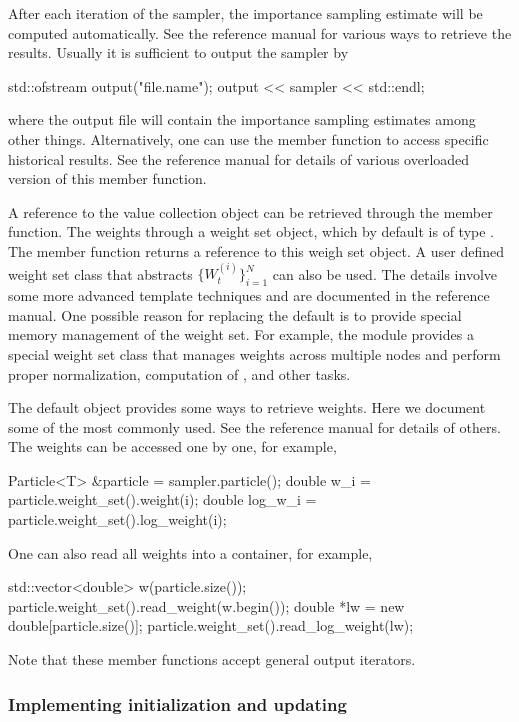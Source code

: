 After each iteration of the sampler, the importance sampling estimate will be
computed automatically. See the reference manual for various ways to retrieve
the results. Usually it is sufficient to output the sampler by
\begin{cppcode}
std::ofstream output("file.name");
output << sampler << std::endl;
\end{cppcode}
where the output file will contain the importance sampling estimates among
other things. Alternatively, one can use the  member
function to access specific historical results. See the reference manual for
details of various overloaded version of this member function.

A reference to the value collection  object can be retrieved through
the  member function. The weights through a weight
set object, which by default is of type . The
 member function returns a reference to this
weigh set object. A user defined weight set class that abstracts
$\{W_t^{(i)}\}_{i=1}^N$ can also be used. The details involve some more
advanced \cpp template techniques and are documented in the reference manual.
One possible reason for replacing the default is to provide special memory
management of the weight set. For example, the \mpi module provides a special
weight set class that manages weights across multiple nodes and perform proper
normalization, computation of \ess, and other tasks.

The default  object provides some ways to retrieve weights.
Here we document some of the most commonly used. See the reference manual for
details of others. The weights can be accessed one by one, for example,
\begin{cppcode}
Particle<T> &particle = sampler.particle();
double w_i     = particle.weight_set().weight(i);
double log_w_i = particle.weight_set().log_weight(i);
\end{cppcode}
One can also read all weights into a container, for example,
\begin{cppcode}
std::vector<double> w(particle.size());
particle.weight_set().read_weight(w.begin());
double *lw = new double[particle.size()];
particle.weight_set().read_log_weight(lw);
\end{cppcode}
Note that these member functions accept general output iterators.

\subsubsection{Implementing initialization and updating}
\label{ssub:Implementing initialization and updating}


